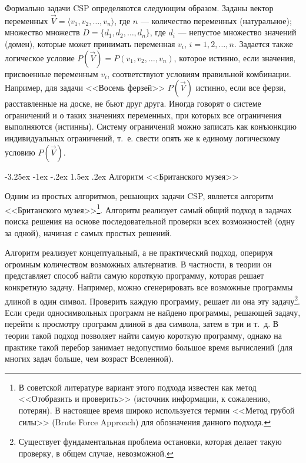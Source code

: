 \documentclass[12pt, openany, twoside]{book} %
\makeatletter
\renewcommand\section{\@startsection {section}{1}{\z@}%
                                   {-3.25ex \@plus -1ex \@minus -.2ex}%
                                   {1.5ex \@plus.2ex}%
                                   {\normalfont\large\bfseries}}
\makeatother
\begin{document}
Формально задачи CSP определяются следующим образом. Заданы вектор переменных $\vec{V}=\langle v_1, v_2, \ldots, v_n\rangle$, где $n$ --- количество переменных (натуральное); множество множеств $D=\{ d_1, d_2, \ldots, d_n\}$, где $d_i$ --- непустое множество значений (домен), которые может принимать переменная $v_i$, $i=1,2,\ldots,n$. Задается также логическое условие $P(\vec{V})=P(v_1,v_2,\ldots,v_n)$, которое истинно, если значения, присвоенные переменным $v_i$, соответствуют условиям правильной комбинации. Например, для задачи <<Восемь ферзей>> $P(\vec{V})$ истинно, если все ферзи, расставленные на доске, не бьют друг друга. Иногда говорят о системе ограничений и о таких значениях переменных, при которых все ограничения выполняются (истинны). Систему ограничений можно записать как конъюнкцию индивидуальных ограничений, т.~е. свести опять же к единому логическому условию $P(\vec{V})$.

\section{Алгоритм <<Британского музея>>}

Одним из простых алгоритмов, решающих задачи CSP, является алгоритм <<Британского музея>>\footnote{В советской литературе вариант этого подхода известен как метод <<Отобразить и проверить>> (источник информации, к сожалению, потерян). В настоящее время широко используется термин <<Метод грубой силы>> (Brute Force Approach) для обозначения данного подхода.}. Алгоритм реализует самый общий подход в задачах поиска решения на основе последовательной проверки всех возможностей (одну за одной), начиная с самых простых решений.

Алгоритм реализует концептуальный, а не практический подход, оперируя огромным количеством возможных альтернатив. В частности, в теории он представляет способ найти самую короткую программу, которая решает конкретную задачу. Например, можно сгенерировать все возможные программы длиной в один символ. Проверить каждую программу, решает ли она эту задачу\footnote{Существует фундаментальная проблема остановки, которая делает такую проверку, в общем случае, невозможной.}. Если среди односимвольных программ не найдено программы, решающей задачу, перейти к просмотру программ длиной в два символа, затем в три и т.~д. В теории такой подход позволяет найти самую короткую программу, однако на практике такой перебор занимает недопустимо большое время вычислений (для многих задач больше, чем возраст Вселенной).
\end{document}
